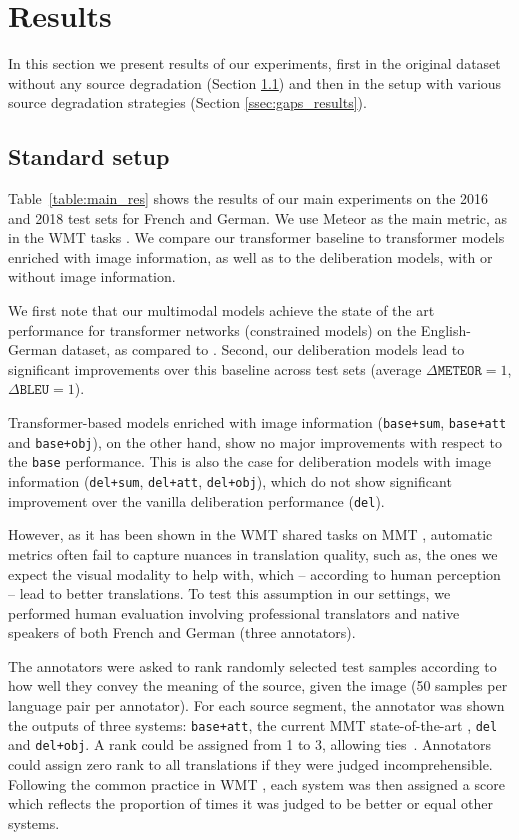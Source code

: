 \documentclass[11pt,a4paper]{article}
\newcommand{\bleu}{\texttt{BLEU}\xspace}
\newcommand{\meteor}{\texttt{METEOR}\xspace}
\newcommand{\base}{\texttt{base}\xspace}
\newcommand{\basesum}{\texttt{base+sum}\xspace}
\newcommand{\baseatt}{\texttt{base+att}\xspace}
\newcommand{\baseattobj}{\texttt{base+obj}\xspace}
\newcommand{\delib}{\texttt{del}\xspace}
\newcommand{\delibsum}{\texttt{del+sum}\xspace}
\newcommand{\delibatt}{\texttt{del+att}\xspace}
\newcommand{\delibattobj}{\texttt{del+obj}\xspace}
\begin{document}
\section{Results}\label{ssec:results}

In this section we present results of our experiments, first in the original dataset without any source degradation (Section \ref{ssec:standard_setup}) and then in the setup with various source degradation strategies (Section \ref{ssec:gaps_results}).

\subsection{Standard setup}\label{ssec:standard_setup}

Table~\ref{table:main_res} shows the results of our main experiments on the 2016 and 2018 test sets for French and German. We use Meteor \cite{denkowski:lavie:meteor-wmt:2014} as the main metric, as in the WMT tasks \cite{BarraultEtAl:2018}. We compare our transformer baseline to transformer models enriched with image information, as well as to the deliberation models, with or without image information. 

We first note that our multimodal models achieve the state of the art performance for transformer networks (constrained models) on the English-German dataset, as compared to \cite{HelclEtAl:2018}. 
Second, our deliberation models lead to significant improvements over this baseline across test sets (average $\Delta\meteor=1$, $\Delta\bleu=1$). 

Transformer-based models enriched with image information (\basesum, \baseatt and \baseattobj), on the other hand,  show no major improvements with respect to the \base performance. This is also the case for deliberation models with image information (\delibsum, \delibatt, \delibattobj), which do not show significant improvement over the vanilla deliberation performance (\delib).


However, as it has been shown in the WMT shared tasks on MMT \cite{SpeciaEtAl:2016,elliott-EtAl:2017:WMT, BarraultEtAl:2018}, automatic metrics often fail to capture nuances in translation quality, such as, the ones we expect the visual modality to help with, which -- according to human perception -- lead to better translations.  To test this assumption in our settings, we performed human evaluation involving professional translators and native speakers of both French and German (three annotators). 

The annotators were asked to rank randomly selected test samples according to how well they convey the meaning of the source, given the image (50 samples per language pair per annotator). For each source segment, the annotator was shown the outputs of three systems: \baseatt, the current MMT state-of-the-art \cite{HelclEtAl:2018}, \delib and \delibattobj. A rank could be assigned from 1 to 3, allowing  ties~\cite{W17-4717}. Annotators could assign zero rank to all translations if they were judged incomprehensible.
Following the common practice in WMT \cite{W17-4717}, each system was then assigned a score which reflects the proportion of times it was judged to be better or equal other  systems.
\end{document}
